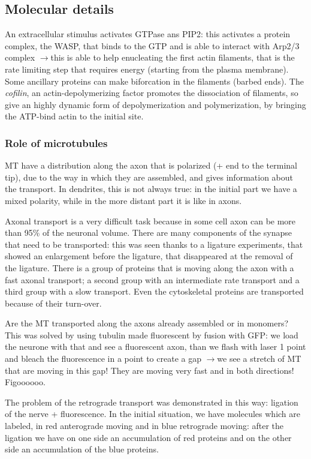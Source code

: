 \documentclass[a4paper, 12pt]{book}
\newcommand{\lfreccia}{\ensuremath{\longrightarrow}}
\begin{document}
\subsection{Molecular details}

An extracellular stimulus activates GTPase ans PIP2: this activates a protein complex, the WASP, that binds to the GTP and is able to interact with Arp2/3 complex \lfreccia this is able to help enucleating the first actin filaments, that is the rate limiting step that requires energy (starting from the plasma membrane). Some ancillary proteins can make biforcation in the filaments (barbed ends). The \emph{cofilin}, an actin-depolymerizing factor promotes the dissociation of filaments, so give an highly dynamic form of depolymerization  and polymerization, by bringing the ATP-bind actin to the initial site.

\subsubsection{Role of microtubules}
MT have a distribution along the axon that is polarized (+ end to the terminal tip), due to the way in which they are assembled, and gives information about the transport. In dendrites, this is not always true: in the initial part we have a mixed polarity, while in the more distant part it is like in axons. 

Axonal transport is a very difficult task because in some cell axon can be more than 95\% of the neuronal volume. There are many components of the synapse that need to be transported: this was seen thanks to a ligature experiments, that showed an enlargement before the ligature, that disappeared at the removal of the ligature. 
There is a group of proteins that is moving along the axon with a fast axonal transport; a second group with an intermediate rate transport and a third group with a slow transport. Even the cytoskeletal proteins are transported because of their turn-over.

Are the MT transported along the axons already assembled or in monomers? This was solved by using tubulin made fluorescent by fusion with GFP: we load the neurone with that and see a fluorescent axon, than we flash with laser 1 point and bleach the fluorescence in a point to create a gap \lfreccia we see a stretch of MT that are moving in this gap! They are moving very fast and in both directions! Figoooooo.

The problem of the retrograde transport was demonstrated in this way: ligation of the nerve + fluorescence. In the initial situation, we have molecules which are labeled, in red anterograde moving and in blue retrograde moving: after the ligation we have on one side an accumulation of red proteins and on the other side an accumulation of the blue proteins.
\end{document}
